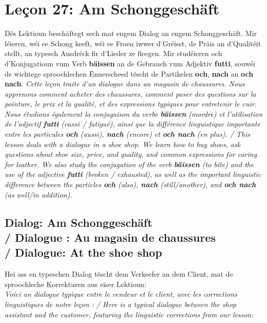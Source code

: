 \chapter{Leçon 27: Am Schonggeschäft}

Dës Lektioun beschäftegt sech mat engem Dialog an engem Schonggeschäft. Mir léieren, wéi ee Schong keeft, wéi ee Froen iwwer d'Gréisst, de Präis an d'Qualitéit stellt, an typesch Ausdréck fir d'Lieder ze fleegen. Mir studéieren och d'Konjugatioun vum Verb \textbf{bäissen} an de Gebrauch vum Adjektiv \textbf{futti}, souwéi de wichtege sproochlechen Ënnerscheed tëscht de Partikelen \textbf{och}, \textbf{nach} an \textbf{och nach}. \textit{Cette leçon traite d'un dialogue dans un magasin de chaussures. Nous apprenons comment acheter des chaussures, comment poser des questions sur la pointure, le prix et la qualité, et des expressions typiques pour entretenir le cuir. Nous étudions également la conjugaison du verbe \textbf{bäissen} (mordre) et l'utilisation de l'adjectif \textbf{futti} (cassé / fatigué), ainsi que la différence linguistique importante entre les particules \textbf{och} (aussi), \textbf{nach} (encore) et \textbf{och nach} (en plus). / This lesson deals with a dialogue in a shoe shop. We learn how to buy shoes, ask questions about shoe size, price, and quality, and common expressions for caring for leather. We also study the conjugation of the verb \textbf{bäissen} (to bite) and the use of the adjective \textbf{futti} (broken / exhausted), as well as the important linguistic difference between the particles \textbf{och} (also), \textbf{nach} (still/another), and \textbf{och nach} (as well/in addition).}

\vspace{1em}

\section[Dialog: Am Schonggeschäft / Dialogue : Au magasin de chaussures / Dialogue: At the shoe shop]{Dialog: Am Schonggeschäft \\/ Dialogue : Au magasin de chaussures \\/ Dialogue: At the shoe shop}

Hei ass en typeschen Dialog tëscht dem Verkeefer an dem Client, mat de sproochleche Korrekturen aus eiser Lektioun: \\
\textit{Voici un dialogue typique entre le vendeur et le client, avec les corrections linguistiques de notre leçon : / Here is a typical dialogue between the shop assistant and the customer, featuring the linguistic corrections from our lesson:}

